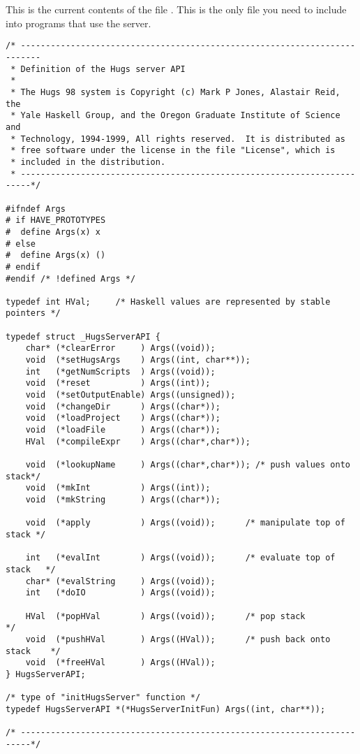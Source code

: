 \appendix

\section{}\label{server.c}

This is the current contents of the file .  This is
the only file you need to include into programs that use the server.

\begin{verbatim}
/* --------------------------------------------------------------------------
 * Definition of the Hugs server API
 *
 * The Hugs 98 system is Copyright (c) Mark P Jones, Alastair Reid, the
 * Yale Haskell Group, and the Oregon Graduate Institute of Science and
 * Technology, 1994-1999, All rights reserved.  It is distributed as
 * free software under the license in the file "License", which is
 * included in the distribution.
 * ------------------------------------------------------------------------*/

#ifndef Args
# if HAVE_PROTOTYPES
#  define Args(x) x
# else
#  define Args(x) ()
# endif
#endif /* !defined Args */

typedef int HVal;     /* Haskell values are represented by stable pointers */

typedef struct _HugsServerAPI {
    char* (*clearError     ) Args((void));
    void  (*setHugsArgs    ) Args((int, char**));
    int   (*getNumScripts  ) Args((void));
    void  (*reset          ) Args((int));
    void  (*setOutputEnable) Args((unsigned));
    void  (*changeDir      ) Args((char*));
    void  (*loadProject    ) Args((char*));
    void  (*loadFile       ) Args((char*));
    HVal  (*compileExpr    ) Args((char*,char*));

    void  (*lookupName     ) Args((char*,char*)); /* push values onto stack*/
    void  (*mkInt          ) Args((int));
    void  (*mkString       ) Args((char*));

    void  (*apply          ) Args((void));      /* manipulate top of stack */

    int   (*evalInt        ) Args((void));      /* evaluate top of stack   */
    char* (*evalString     ) Args((void));
    int   (*doIO           ) Args((void));

    HVal  (*popHVal        ) Args((void));      /* pop stack               */
    void  (*pushHVal       ) Args((HVal));      /* push back onto stack    */
    void  (*freeHVal       ) Args((HVal)); 
} HugsServerAPI;

/* type of "initHugsServer" function */
typedef HugsServerAPI *(*HugsServerInitFun) Args((int, char**));

/* ------------------------------------------------------------------------*/

\end{verbatim}


